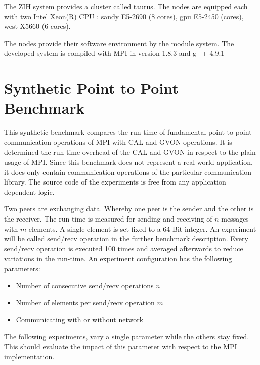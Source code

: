 The ZIH system provides a cluster called taurus. The nodes are
equipped each with two Intel Xeon(R) CPU : sandy E5-2690 (8 cores),
gpu E5-2450 (cores), west X5660 (6 cores).

The nodes provide their software environment by the module system.
The developed system is compiled with MPI in version 1.8.3 and
g++ 4.9.1 


\section{Synthetic Point to Point Benchmark}
This synthetic benchmark compares the run-time of fundamental
point-to-point communication operations of MPI with CAL and GVON
operations. It is determined the run-time overhead of the CAL and GVON
in respect to the plain usage of MPI. Since this benchmark does not
represent a real world application, it does only contain communication
operations of the particular communication library. The source code of
the experiments is free from any application dependent logic.

Two peers are exchanging data. Whereby one peer is the sender and the
other is the receiver. The run-time is measured for sending and
receiving of $n$ messages with $m$ elements.  A single element is set
fixed to a 64 Bit integer.  An experiment will be called send/recv
operation in the further benchmark description. Every send/recv
operation is executed 100 times and averaged afterwards to reduce
variations in the run-time. An experiment configuration has the
following parameters:

\begin{itemize}
  \item Number of consecutive send/recv operations $n$
  \item Number of elements per send/recv operation $m$
  \item Communicating with or without network
\end{itemize}

\noindent The following experiments, vary a single parameter while the
others stay fixed. This should evaluate the impact of this parameter
with respect to the MPI implementation.

